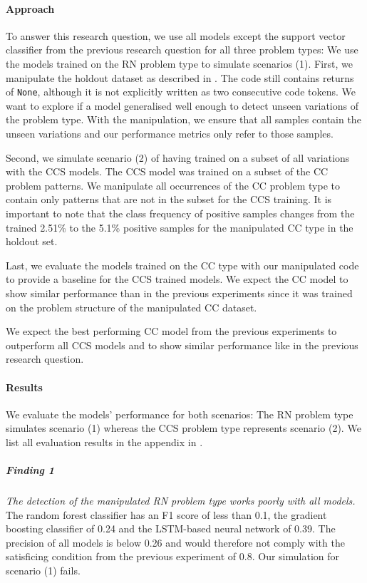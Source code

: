 \paragraph{Approach}
To answer this research question, we use all models except the support vector classifier from the previous research question for all three problem types: 
We use the models trained on the RN problem type to simulate scenarios (1). First, we manipulate the holdout dataset as described in . The code still contains returns of \texttt{None}, although it is not explicitly written as two consecutive code tokens. We want to explore if a model generalised well enough to detect unseen variations of the problem type. With the manipulation, we ensure that all samples contain the unseen variations and our performance metrics only refer to those samples. 

Second, we simulate scenario (2) of having trained on a subset of all variations with the CCS models. The CCS model was trained on a subset of the CC problem patterns. We manipulate all occurrences of the CC problem type to contain only patterns that are not in the subset for the CCS training. It is important to note that the class frequency of positive samples changes from the trained 2.51\% to the 5.1\% positive samples for the manipulated CC type in the holdout set.

Last, we evaluate the models trained on the CC type with our manipulated code to provide a baseline for the CCS trained models. We expect the CC model to show similar performance than in the previous experiments since it was trained on the problem structure of the manipulated CC dataset.

We expect the best performing CC model from the previous experiments to outperform all CCS models and to show similar performance like in the previous research question. 

\paragraph{Results}
We evaluate the models' performance for both scenarios: The RN problem type simulates scenario (1) whereas the CCS problem type represents scenario (2). We list all evaluation results in the appendix in .

\subparagraph{Finding 1}\label{finding:return_none_manipulated_bad}
\textit{The detection of the manipulated RN problem type works poorly with all models.} The random forest classifier has an F1 score of less than 0.1, the gradient boosting classifier of 0.24 and the LSTM-based neural network of 0.39. The precision of all models is below 0.26 and would therefore not comply with the satisficing condition from the previous experiment of 0.8. Our simulation for scenario (1) fails.

